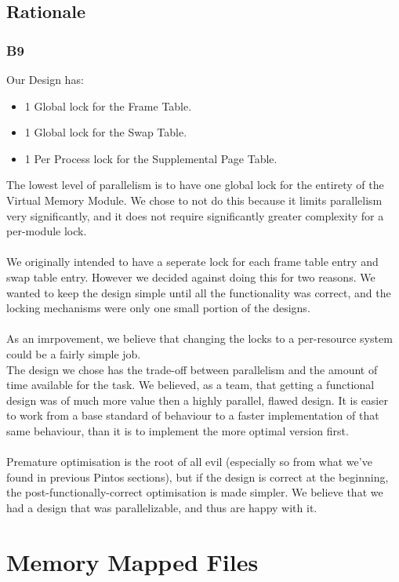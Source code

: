 \documentclass[a4wide, 11pt]{article}
\begin{document}
\subsection{Rationale}
\subsubsection{B9}

Our Design has:
\begin{itemize}
\item 1 Global lock for the Frame Table.
\item 1 Global lock for the Swap Table.
\item 1 Per Process lock for the Supplemental Page Table.
\end{itemize}

The lowest level of parallelism is to have one global lock for the entirety of the Virtual Memory Module. We chose to not do this because it limits parallelism very significantly, and it does not require significantly greater complexity for a per-module lock.\\
\\
We originally intended to have a seperate lock for each frame table entry and swap table entry. However we decided against doing this for two reasons. We wanted to keep the design simple until all the functionality was correct, and the locking mechanisms were only one small portion of the designs.\\
\\
As an imrpovement, we believe that changing the locks to a per-resource system could be a fairly simple job.
\\
The design we chose has the trade-off between parallelism and the amount of time available for the task. We believed, as a team, that getting a functional design was of much more value then a highly parallel, flawed design. It is easier to work from a base standard of behaviour to a faster implementation of that same behaviour, than it is to implement the more optimal version first.\\
\\ Premature optimisation is the root of all evil (especially so from what we've found in previous Pintos sections), but if the design is correct at the beginning, the post-functionally-correct optimisation is made simpler. We believe that we had a design that was parallelizable, and thus are happy with it.



\section{Memory Mapped Files}
\end{document}

